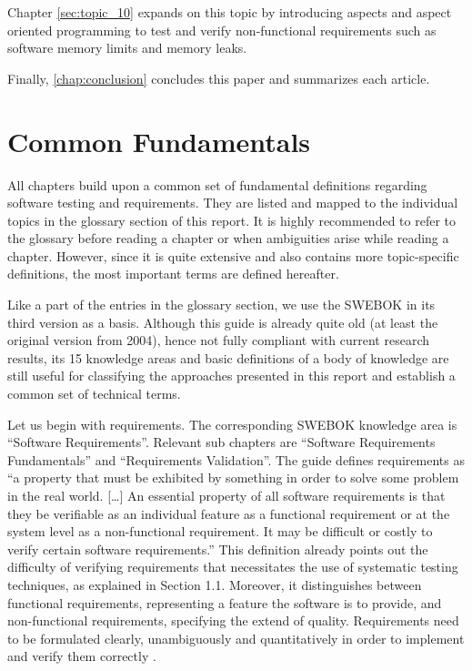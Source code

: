 Chapter \ref{sec:topic_10} %
expands on this topic by introducing aspects and aspect oriented programming to test and verify non-functional requirements such as software memory limits and memory leaks.

Finally, \autoref{chap:conclusion} concludes this paper and summarizes each article.

\section{Common Fundamentals}\label{sec:introduction_common_fundamentals}
All chapters build upon a common set of fundamental definitions regarding software testing and requirements.
They are listed and mapped to the individual topics in the glossary section of this report.
It is highly recommended to refer to the glossary before reading a chapter or when ambiguities arise while reading a chapter.
However, since it is quite extensive and also contains more topic-specific definitions, the most important terms are defined hereafter.

Like a part of the entries in the glossary section, we use the SWEBOK in its third version as a basis.
Although this guide is already quite old (at least the original version from 2004), hence not fully compliant with current research results, its 15 knowledge areas and basic definitions of a body of knowledge are still useful for classifying the approaches presented in this report and establish a common set of technical terms.

Let us begin with requirements.
The corresponding SWEBOK knowledge area is \enquote{Software Requirements}.
Relevant sub chapters are \enquote{Software Requirements Fundamentals} and \enquote{Requirements Validation}.
The guide defines requirements as \enquote{a property that must be exhibited by something in order to solve some problem in the real world. [\ldots]
An essential property of all software requirements is that they be verifiable as an individual feature as a functional requirement or at the system level as a non-functional requirement.
It may be difficult or costly to verify certain software requirements.} \cite{SWEBOK}
This definition already points out the difficulty of verifying requirements that necessitates the use of systematic testing techniques, as explained in Section 1.1.
Moreover, it distinguishes between functional requirements, representing a feature the software is to provide, and non-functional requirements, specifying the extend of quality.
Requirements need to be formulated clearly, unambiguously and quantitatively in order to implement and verify them correctly \cite{SWEBOK}.

